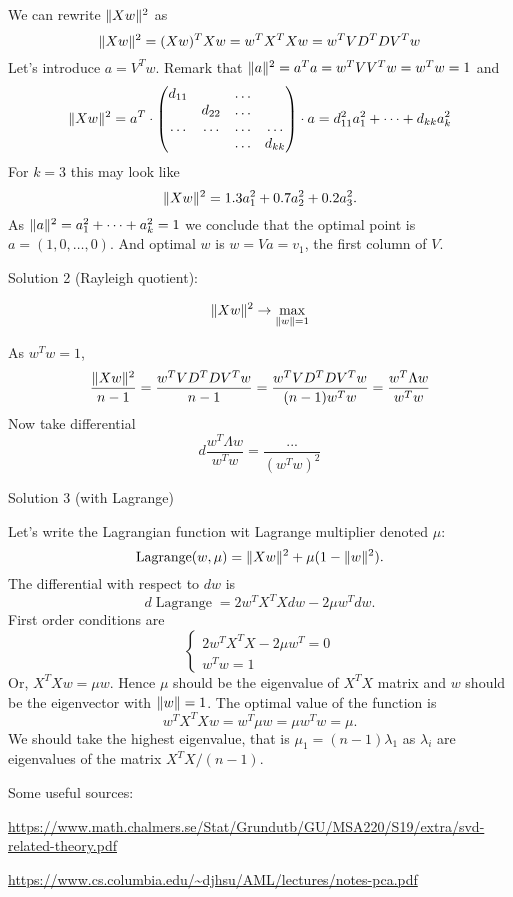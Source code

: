 \documentclass[12pt]{article}
\DeclareMathOperator{\Lagr}{Lagrange}
\DeclarePairedDelimiter{\norm}{\lVert}{\rVert}
\begin{document}
We can rewrite $\norm{Xw}^2$ as
\[
\norm{Xw}^2 = (Xw)^T Xw = w^T X^T Xw = w^T VD^T DV^T w
\]
Let's introduce $a = V^T w$.
Remark that $\norm{a}^2 = a^T a = w^T VV^T w = w^T w = 1$ and
\[
    \norm{Xw}^2 = a^T \cdot \begin{pmatrix}
        d_{11} &  & \dots &  \\
          & d_{22} & \dots &  \\
        \dots & \dots & \dots & \dots \\
         &  & \dots & d_{kk} \\
    \end{pmatrix} \cdot a
    = d_{11}^2 a_1^2 + \dots + d_{kk} a_k^2
\]
For $k = 3$ this may look like
\[
    \norm{Xw}^2 = 1.3 a_1^2 + 0.7 a_2^2 + 0.2 a_3^2.
\]
As $\norm{a}^2 = a_1^2 + \dots + a_k^2 = 1$ we conclude that the optimal point is $a = (1, 0, \dots, 0)$. 
And optimal $w$ is $w = Va = v_1$, the first column of $V$.

Solution 2 (Rayleigh quotient):

\[
\norm{Xw}^2  \to \max_{\norm{w} = 1}
\]

As $w^Tw = 1$,
\[
    \frac{\norm{Xw}^2}{n - 1} = \frac{w^T VD^T DV^T w}{n-1} = \frac{w^T VD^T DV^T w }{ (n - 1)w^Tw }   = \frac{w^T \Lambda w}{ w^T w}
\]
Now take differential 
\[
d \frac{w^T \Lambda w}{ w^T w} = \frac{...}{ (w^T w)^2}
\]

Solution 3 (with Lagrange)

Let's write the Lagrangian function wit Lagrange multiplier denoted $\mu$:
\[
\Lagr(w, \mu) = \norm{Xw}^2 + \mu (1 - \norm{w}^2).
\]
The differential with respect to $dw$ is 
\[
d \Lagr = 2w^T X^T X dw - 2 \mu w^T dw.
\]
First order conditions are
\[
\begin{cases}
2w^T X^T X - 2 \mu w^T = 0 \\
w^Tw = 1  
\end{cases}
\]
Or, $X^TX w = \mu w$. 
Hence $\mu$ should be the eigenvalue of $X^TX$ matrix and $w$ should be the eigenvector with $\norm{w} = 1$.
The optimal value of the function is 
\[
w^T X^TX w = w^T \mu w = \mu w^T w = \mu.
\]
We should take the highest eigenvalue, that is $\mu_1 = (n - 1)\lambda_1$ as $\lambda_i$ are eigenvalues of the matrix $X^TX/(n-1)$.


Some useful sources:

\url{https://www.math.chalmers.se/Stat/Grundutb/GU/MSA220/S19/extra/svd-related-theory.pdf}

\url{https://www.cs.columbia.edu/~djhsu/AML/lectures/notes-pca.pdf}
\end{document}
